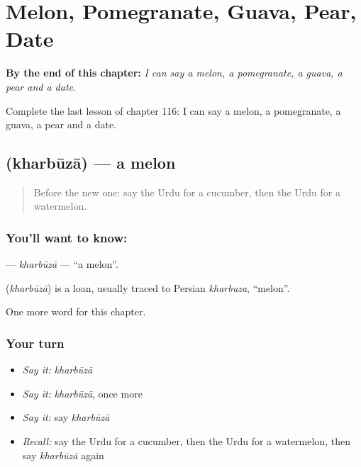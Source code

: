 
\chapter{Melon, Pomegranate, Guava, Pear, Date}
\label{ch:ur-melon-pomegranate-guava-pear-date}

\begin{chapteropening}
\textbf{By the end of this chapter:} \emph{I can say a melon, a pomegranate, a guava, a pear and a date.}

Complete the last lesson of chapter 116: I can say a melon, a pomegranate, a guava, a pear and a date.
\end{chapteropening}

\section[\texorpdfstring{\ur{خربوزہ} (kharbūzā)}{خربوزہ (kharbūzā)}]{ (kharbūzā) — a melon}

\label{lesson:UR-C116-kharbuza}



\begin{quote}
Before the new one: say the Urdu for a cucumber, then the Urdu for a watermelon.
\end{quote}

\subsection*{You'll want to know: }
\textbf{} — \emph{kharbūzā} — \textquotedblleft{}a melon\textquotedblright{}.

\begin{cousinweb}
\textbf{} (\emph{kharbūzā}) is a loan, usually traced to Persian \emph{kharbuza}, \textquotedblleft{}melon\textquotedblright{}.
\end{cousinweb}

\begin{grammarlens}[title={What you've built}]
One more word for this chapter.
\end{grammarlens}

\subsection*{Your turn}
\begin{itemize}
\raggedright
  \item \emph{Say it:} \emph{kharbūzā}
  \item \emph{Say it:} \emph{kharbūzā}, once more
  \item \emph{Say it:} say \emph{kharbūzā}
  \item \emph{Recall:} say the Urdu for a cucumber, then the Urdu for a watermelon, then say \emph{kharbūzā} again
\end{itemize}

